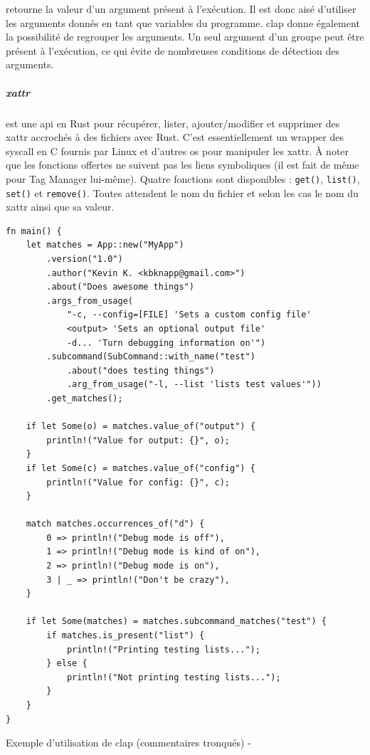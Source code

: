 retourne la valeur d'un argument présent à l'exécution. Il est donc aisé d'utiliser les arguments 
donnés en tant que variables du programme. clap donne également la possibilité de regrouper les 
arguments. Un seul argument d'un groupe peut être présent à l'exécution, ce qui évite de nombreuses 
conditions de détection des arguments.
\subparagraph{xattr}
est une \acrshort{api} 
en Rust pour récupérer, lister, ajouter/modifier et supprimer des \acrshort{xattr} accrochés à des 
fichiers avec Rust. C'est essentiellement un wrapper des \acrshort{syscall} en C fournis par Linux 
et d'autres \acrshort{os} pour manipuler les \acrshort{xattr}. À noter que les fonctions offertes ne 
suivent pas les liens symboliques (il est fait de même pour Tag Manager lui-même). Quatre fonctions 
sont disponibles : \texttt{get()}, \texttt{list()}, \texttt{set()} 
et \texttt{remove()}. Toutes attendent le nom du fichier et selon les cas le nom du 
\acrshort{xattr} ainsi que sa valeur.
\bigbreak
\begin{code}
    \begin{verbatim}
fn main() {
    let matches = App::new("MyApp")
        .version("1.0")
        .author("Kevin K. <kbknapp@gmail.com>")
        .about("Does awesome things")
        .args_from_usage(
            "-c, --config=[FILE] 'Sets a custom config file'
            <output> 'Sets an optional output file'
            -d... 'Turn debugging information on'")
        .subcommand(SubCommand::with_name("test")
            .about("does testing things")
            .arg_from_usage("-l, --list 'lists test values'"))
        .get_matches();

    if let Some(o) = matches.value_of("output") {
        println!("Value for output: {}", o);
    }
    if let Some(c) = matches.value_of("config") {
        println!("Value for config: {}", c);
    }

    match matches.occurrences_of("d") {
        0 => println!("Debug mode is off"),
        1 => println!("Debug mode is kind of on"),
        2 => println!("Debug mode is on"),
        3 | _ => println!("Don't be crazy"),
    }

    if let Some(matches) = matches.subcommand_matches("test") {
        if matches.is_present("list") {
            println!("Printing testing lists...");
        } else {
            println!("Not printing testing lists...");
        }
    }
}
    \end{verbatim}
    \caption{Exemple d'utilisation de clap (commentaires tronqués) - \cite{ref42}}
    \label{tag_manager_clap}
\end{code}
